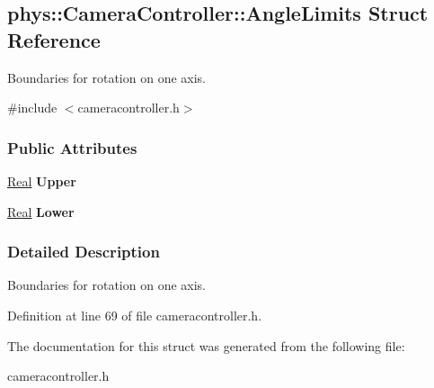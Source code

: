 \hypertarget{structphys_1_1CameraController_1_1AngleLimits}{
\subsection{phys::CameraController::AngleLimits Struct Reference}
\label{d7/d6f/structphys_1_1CameraController_1_1AngleLimits}
}


Boundaries for rotation on one axis.  




{\ttfamily \#include $<$cameracontroller.h$>$}

\subsubsection*{Public Attributes}
\begin{DoxyCompactItemize}
\item 
\hypertarget{structphys_1_1CameraController_1_1AngleLimits_a901b87bdfec7270a2b81e31d1313e8a6}{
\hyperlink{namespacephys_af7eb897198d265b8e868f45240230d5f}{Real} {\bfseries Upper}}
\label{d7/d6f/structphys_1_1CameraController_1_1AngleLimits_a901b87bdfec7270a2b81e31d1313e8a6}

\item 
\hypertarget{structphys_1_1CameraController_1_1AngleLimits_abd9211130ba87af89f57760936491762}{
\hyperlink{namespacephys_af7eb897198d265b8e868f45240230d5f}{Real} {\bfseries Lower}}
\label{d7/d6f/structphys_1_1CameraController_1_1AngleLimits_abd9211130ba87af89f57760936491762}

\end{DoxyCompactItemize}


\subsubsection{Detailed Description}
Boundaries for rotation on one axis. 

Definition at line 69 of file cameracontroller.h.



The documentation for this struct was generated from the following file:\begin{DoxyCompactItemize}
\item 
cameracontroller.h\end{DoxyCompactItemize}
